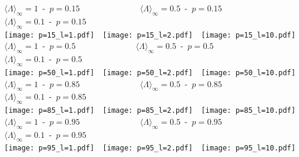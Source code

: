 \documentclass[final,authoryear,5p,times,twocolumn]{elsarticle}
\begin{document}
\begin{figure*}
\begin{center}
${\langle \Lambda \rangle}_{\infty}=1$\,\,\,-\,\,\,$p=0.15$\,\,\,\,\,\,\,\,\,\,\,\,\,\,\,\,\,\,\,\,\,\,\,\,\,\,\,\,\,\,\,\,\,\,\,\,\,\,\,\,\,\,\,${\langle \Lambda \rangle}_{\infty}=0.5$\,\,\,-\,\,\,$p=0.15$\,\,\,\,\,\,\,\,\,\,\,\,\,\,\,\,\,\,\,\,\,\,\,\,\,\,\,\,\,\,\,\,\,\,\,\,\,\,\,\,\,\,\,\,\,\,\,\,${\langle \Lambda \rangle}_{\infty}=0.1$\,\,\,-\,\,\,$p=0.15$\\
\texttt{[image: p=15\_l=1.pdf]}\,\,\,\,
\texttt{[image: p=15\_l=2.pdf]}\,\,\,\,
\texttt{[image: p=15\_l=10.pdf]}\\
${\langle \Lambda \rangle}_{\infty}=1$\,\,\,-\,\,\,$p=0.5$\,\,\,\,\,\,\,\,\,\,\,\,\,\,\,\,\,\,\,\,\,\,\,\,\,\,\,\,\,\,\,\,\,\,\,\,\,\,\,\,\,\,\,${\langle \Lambda \rangle}_{\infty}=0.5$\,\,\,-\,\,\,$p=0.5$\,\,\,\,\,\,\,\,\,\,\,\,\,\,\,\,\,\,\,\,\,\,\,\,\,\,\,\,\,\,\,\,\,\,\,\,\,\,\,\,\,\,\,\,\,\,\,\,${\langle \Lambda \rangle}_{\infty}=0.1$\,\,\,-\,\,\,$p=0.5$\\
\texttt{[image: p=50\_l=1.pdf]}\,\,\,\,
\texttt{[image: p=50\_l=2.pdf]}\,\,\,\,
\texttt{[image: p=50\_l=10.pdf]}\\
${\langle \Lambda \rangle}_{\infty}=1$\,\,\,-\,\,\,$p=0.85$\,\,\,\,\,\,\,\,\,\,\,\,\,\,\,\,\,\,\,\,\,\,\,\,\,\,\,\,\,\,\,\,\,\,\,\,\,\,\,\,\,\,\,${\langle \Lambda \rangle}_{\infty}=0.5$\,\,\,-\,\,\,$p=0.85$\,\,\,\,\,\,\,\,\,\,\,\,\,\,\,\,\,\,\,\,\,\,\,\,\,\,\,\,\,\,\,\,\,\,\,\,\,\,\,\,\,\,\,\,\,\,\,\,${\langle \Lambda \rangle}_{\infty}=0.1$\,\,\,-\,\,\,$p=0.85$\\
\texttt{[image: p=85\_l=1.pdf]}\,\,\,\,
\texttt{[image: p=85\_l=2.pdf]}\,\,\,\,
\texttt{[image: p=85\_l=10.pdf]}\\
${\langle \Lambda \rangle}_{\infty}=1$\,\,\,-\,\,\,$p=0.95$\,\,\,\,\,\,\,\,\,\,\,\,\,\,\,\,\,\,\,\,\,\,\,\,\,\,\,\,\,\,\,\,\,\,\,\,\,\,\,\,\,\,\,${\langle \Lambda \rangle}_{\infty}=0.5$\,\,\,-\,\,\,$p=0.95$\,\,\,\,\,\,\,\,\,\,\,\,\,\,\,\,\,\,\,\,\,\,\,\,\,\,\,\,\,\,\,\,\,\,\,\,\,\,\,\,\,\,\,\,\,\,\,\,${\langle \Lambda \rangle}_{\infty}=0.1$\,\,\,-\,\,\,$p=0.95$\\
\texttt{[image: p=95\_l=1.pdf]}\,\,\,\,
\texttt{[image: p=95\_l=2.pdf]}\,\,\,\,
\texttt{[image: p=95\_l=10.pdf]}\\

\end{center}
\end{figure*}
\end{document}

